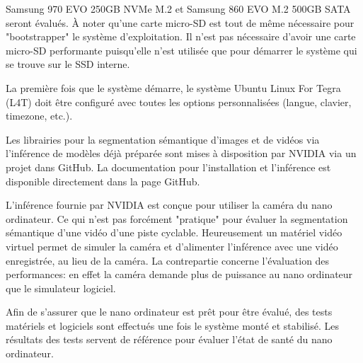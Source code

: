 Samsung 970 EVO 250GB NVMe M.2 et Samsung 860 EVO M.2 500GB SATA seront évalués. À noter qu'une carte micro-SD est tout de même nécessaire pour "bootstrapper" le système d'exploitation. Il n'est pas nécessaire d'avoir une carte micro-SD performante puisqu'elle n'est utilisée que pour démarrer le système qui se trouve sur le SSD interne. 
\par La première fois que le système démarre, le système Ubuntu Linux For Tegra (L4T) doit être configuré avec toutes les options personnalisées (langue, clavier, timezone, etc.).
\par Les librairies pour la segmentation sémantique 
d'images et de vidéos via l'inférence de modèles déjà préparée sont mises à disposition par NVIDIA via un projet dans GitHub. La documentation pour l'installation et l'inférence est disponible directement dans la page GitHub. 
\par L'inférence fournie par NVIDIA est conçue pour utiliser la caméra du nano ordinateur. Ce qui n'est pas forcément "pratique" pour évaluer la segmentation sémantique d'une vidéo d'une piste cyclable. Heureusement un matériel vidéo virtuel permet de simuler la caméra et d'alimenter l'inférence avec une vidéo enregistrée, au lieu de la caméra. La contrepartie concerne l'évaluation des performances:  en effet la caméra demande plus de puissance au nano ordinateur que le simulateur logiciel.
\par Afin de s'assurer que le nano ordinateur est prêt pour être évalué, des tests matériels et logiciels sont  effectués une fois le système monté et stabilisé. Les résultats des tests servent de référence pour évaluer l'état de santé du nano ordinateur. 